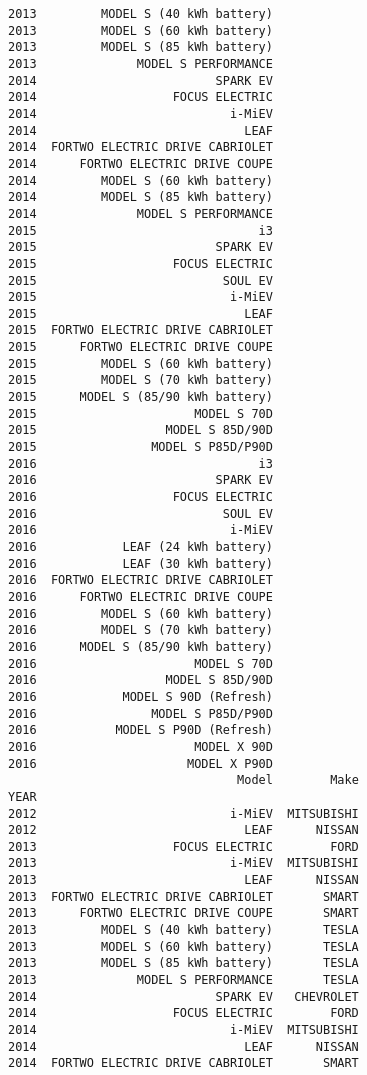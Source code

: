 \documentclass[11pt]{article}
\begin{document}
\begin{Verbatim}[commandchars=\\\{\}]
2013         MODEL S (40 kWh battery)
2013         MODEL S (60 kWh battery)
2013         MODEL S (85 kWh battery)
2013              MODEL S PERFORMANCE
2014                         SPARK EV
2014                   FOCUS ELECTRIC
2014                           i-MiEV
2014                             LEAF
2014  FORTWO ELECTRIC DRIVE CABRIOLET
2014      FORTWO ELECTRIC DRIVE COUPE
2014         MODEL S (60 kWh battery)
2014         MODEL S (85 kWh battery)
2014              MODEL S PERFORMANCE
2015                               i3
2015                         SPARK EV
2015                   FOCUS ELECTRIC
2015                          SOUL EV
2015                           i-MiEV
2015                             LEAF
2015  FORTWO ELECTRIC DRIVE CABRIOLET
2015      FORTWO ELECTRIC DRIVE COUPE
2015         MODEL S (60 kWh battery)
2015         MODEL S (70 kWh battery)
2015      MODEL S (85/90 kWh battery)
2015                      MODEL S 70D
2015                  MODEL S 85D/90D
2015                MODEL S P85D/P90D
2016                               i3
2016                         SPARK EV
2016                   FOCUS ELECTRIC
2016                          SOUL EV
2016                           i-MiEV
2016            LEAF (24 kWh battery)
2016            LEAF (30 kWh battery)
2016  FORTWO ELECTRIC DRIVE CABRIOLET
2016      FORTWO ELECTRIC DRIVE COUPE
2016         MODEL S (60 kWh battery)
2016         MODEL S (70 kWh battery)
2016      MODEL S (85/90 kWh battery)
2016                      MODEL S 70D
2016                  MODEL S 85D/90D
2016            MODEL S 90D (Refresh)
2016                MODEL S P85D/P90D
2016           MODEL S P90D (Refresh)
2016                      MODEL X 90D
2016                     MODEL X P90D
                                Model        Make
YEAR                                             
2012                           i-MiEV  MITSUBISHI
2012                             LEAF      NISSAN
2013                   FOCUS ELECTRIC        FORD
2013                           i-MiEV  MITSUBISHI
2013                             LEAF      NISSAN
2013  FORTWO ELECTRIC DRIVE CABRIOLET       SMART
2013      FORTWO ELECTRIC DRIVE COUPE       SMART
2013         MODEL S (40 kWh battery)       TESLA
2013         MODEL S (60 kWh battery)       TESLA
2013         MODEL S (85 kWh battery)       TESLA
2013              MODEL S PERFORMANCE       TESLA
2014                         SPARK EV   CHEVROLET
2014                   FOCUS ELECTRIC        FORD
2014                           i-MiEV  MITSUBISHI
2014                             LEAF      NISSAN
2014  FORTWO ELECTRIC DRIVE CABRIOLET       SMART

\end{Verbatim}
\end{document}
